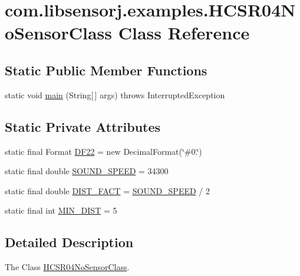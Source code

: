 \hypertarget{classcom_1_1libsensorj_1_1examples_1_1HCSR04NoSensorClass}{}\section{com.\+libsensorj.\+examples.\+H\+C\+S\+R04\+No\+Sensor\+Class Class Reference}
\label{classcom_1_1libsensorj_1_1examples_1_1HCSR04NoSensorClass}
\subsection*{Static Public Member Functions}
\begin{DoxyCompactItemize}
\item 
static void \hyperlink{classcom_1_1libsensorj_1_1examples_1_1HCSR04NoSensorClass_abbbd349b6d62a9488da92b355a3f01ff}{main} (String\mbox{[}$\,$\mbox{]} args)  throws Interrupted\+Exception 
\end{DoxyCompactItemize}
\subsection*{Static Private Attributes}
\begin{DoxyCompactItemize}
\item 
static final Format \hyperlink{classcom_1_1libsensorj_1_1examples_1_1HCSR04NoSensorClass_a41338744496f40c7e80f4faf93bac304}{D\+F22} = new Decimal\+Format(\char`\"{}\#0.\char`\"{})
\item 
static final double \hyperlink{classcom_1_1libsensorj_1_1examples_1_1HCSR04NoSensorClass_aae05bb29da08230984f93f167de14ee6}{S\+O\+U\+N\+D\+\_\+\+S\+P\+E\+E\+D} = 34300
\item 
static final double \hyperlink{classcom_1_1libsensorj_1_1examples_1_1HCSR04NoSensorClass_a447e78595330f5f3be7717047ede01d0}{D\+I\+S\+T\+\_\+\+F\+A\+C\+T} = \hyperlink{classcom_1_1libsensorj_1_1examples_1_1HCSR04NoSensorClass_aae05bb29da08230984f93f167de14ee6}{S\+O\+U\+N\+D\+\_\+\+S\+P\+E\+E\+D} / 2
\item 
static final int \hyperlink{classcom_1_1libsensorj_1_1examples_1_1HCSR04NoSensorClass_a1c873dc1361c25c0c972a4836d8f1169}{M\+I\+N\+\_\+\+D\+I\+S\+T} = 5
\end{DoxyCompactItemize}


\subsection{Detailed Description}
The Class \hyperlink{classcom_1_1libsensorj_1_1examples_1_1HCSR04NoSensorClass}{H\+C\+S\+R04\+No\+Sensor\+Class}.

